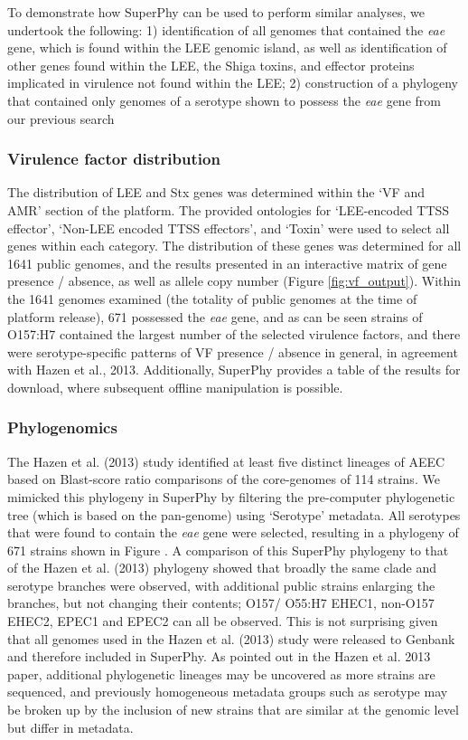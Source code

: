 \documentclass[doublespacing, linenumbers]{bmcart}
\begin{document}
To demonstrate how SuperPhy can be used to perform similar analyses, we undertook the following: 1) identification of all genomes that contained the \textit{eae} gene, which is found within the LEE genomic island, as well as identification of other genes found within the LEE,  the Shiga toxins, and effector proteins implicated in virulence not found within the LEE; 2) construction of a phylogeny that contained only genomes of a serotype shown to possess the \textit{eae} gene from our previous search

\subsubsection{Virulence factor distribution}
The distribution of LEE and Stx genes was determined within the `VF and AMR'  section of the platform. The provided ontologies for `LEE-encoded TTSS effector', `Non-LEE encoded TTSS effectors', and `Toxin' were used to select all genes within each category. The distribution of these genes was determined for all 1641 public genomes, and the results presented in an interactive matrix of gene presence / absence, as well as allele copy number (Figure \ref{fig:vf_output}). Within the 1641 genomes examined (the totality of public genomes at the time of platform release), 671 possessed the \textit{eae} gene, and as can be seen strains of O157:H7 contained the largest number of the selected virulence factors, and there were serotype-specific patterns of VF presence / absence in general, in agreement with Hazen et al., 2013. Additionally, SuperPhy provides a table of the results for download, where subsequent offline manipulation is possible.

\subsubsection{Phylogenomics}
 The Hazen et al. (2013) study identified at least five distinct lineages of AEEC based on Blast-score ratio comparisons of the core-genomes of 114 strains. We mimicked this phylogeny in SuperPhy by filtering the pre-computer phylogenetic tree (which is based on the pan-genome) using `Serotype' metadata. All serotypes that were found to contain the \textit{eae} gene were selected, resulting in a phylogeny of 671 strains shown in Figure . A comparison of this SuperPhy phylogeny to that of the Hazen et al. (2013) phylogeny showed that broadly the same clade and serotype branches were observed, with additional public strains enlarging the branches, but not changing their contents; O157/ O55:H7 EHEC1, non-O157 EHEC2, EPEC1 and EPEC2 can all be observed. This is not surprising given that all genomes used in the Hazen et al. (2013) study were released to Genbank and therefore included in SuperPhy. As pointed out in the Hazen et al. 2013 paper, additional phylogenetic lineages may be uncovered as more strains are sequenced, and previously homogeneous metadata groups such as serotype may be broken up by the inclusion of new strains that are similar at the genomic level but differ in metadata.
\end{document}
